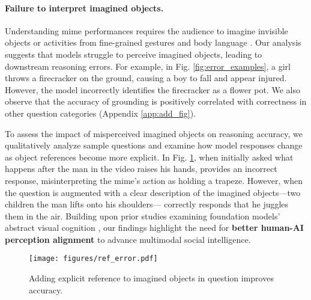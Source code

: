 \paragraph{Failure to interpret imagined objects.}
Understanding mime performances requires the audience to imagine invisible objects or activities from fine-grained gestures and body language \cite{sibierska2022s}. Our analysis suggests that models struggle to perceive imagined objects, leading to downstream reasoning errors. For example, in Fig. \ref{fig:error_examples}, a girl throws a firecracker on the ground, causing a boy to fall and appear injured. However, the model incorrectly identifies the firecracker as a flower pot. We also observe that the accuracy of grounding is positively correlated with correctness in other question categories (Appendix \ref{app:add_fig}).

To assess the impact of misperceived imagined objects on reasoning accuracy, we qualitatively analyze sample questions and examine how model responses change as object references become more explicit. In Fig. \ref{fig:incorrect_ref}, when initially asked what happens after the man in the video raises his hands, {\gemini} provides an incorrect response, misinterpreting the mime’s action as holding a trapeze. However, when the question is augmented with a clear description of the imagined objects—two children the man lifts onto his shoulders—{\gemini} correctly responds that he juggles them in the air. Building upon prior studies examining foundation models’ abstract visual cognition \cite{hsu2024makes, yiu2024kiva, schulze2025visual}, our findings highlight the need for \textbf{better human-AI perception alignment} \cite{muttenthaler2024aligning} to advance multimodal social intelligence.

\begin{figure}[t!]
    \centering
    \vspace{-2mm}
    \texttt{[image: figures/ref\_error.pdf]}
    \vspace{-2mm}
    \caption{Adding explicit reference to imagined objects in question improves {\gemini} accuracy.}
    \vspace{-2mm}
    \label{fig:incorrect_ref}
\end{figure}

